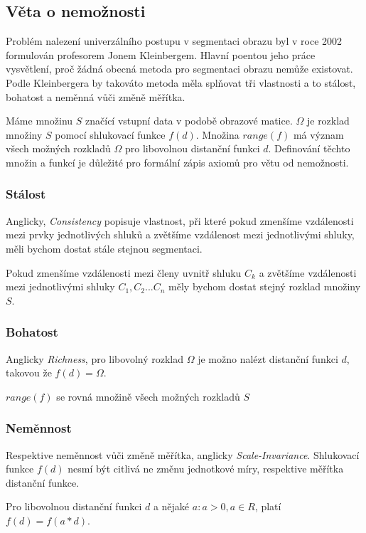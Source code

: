 \documentclass[czech, master, public, dept460, male, cpdeclaration, oneside]{diploma}
\begin{document}
\subsection{Věta o nemožnosti}
Problém nalezení univerzálního postupu v segmentaci obrazu byl v roce 2002 formulován profesorem Jonem Kleinbergem. Hlavní poentou jeho práce vysvětlení, proč žádná obecná metoda pro segmentaci obrazu nemůže existovat. Podle Kleinbergera by takováto metoda měla splňovat tři vlastnosti a to stálost, bohatost a neměnná vůči změně měřítka. \cite{Kleinberg} \par
Máme množinu $S$ značící vstupní data v podobě obrazové matice. $\Omega$ je rozklad množiny $S$ pomocí shlukovací funkce $f(d)$. Množina  $range(f)$ má význam všech možných rozkladů $\Omega$ pro libovolnou distanční funkci  $d$. Definování těchto množin a funkcí je důležité pro formální zápis axiomů pro větu od nemožnosti.

\subsubsection{Stálost}
Anglicky, \textit{Consistency} popisuje vlastnost, při které pokud zmenšíme vzdálenosti mezi prvky jednotlivých shluků a zvětšíme vzdálenost mezi jednotlivými shluky, měli bychom dostat stále stejnou segmentaci.
\begin{definition}
	Pokud zmenšíme vzdálenosti mezi členy uvnitř shluku $C_k$ a zvětšíme vzdálenosti mezi
	jednotlivými shluky $C_1, C_2...C_n$ měly bychom dostat stejný rozklad množiny $S$.
\end{definition}

\subsubsection{Bohatost}
Anglicky \textit{Richness}, pro libovolný rozklad $\Omega$ je možno nalézt distanční funkci $d$, takovou že $f(d) = \Omega$.
\begin{definition}
	$range(f)$ se rovná množině všech možných rozkladů $S$
\end{definition}

\subsubsection{Neměnnost}
Respektive neměnnost vůči změně měřítka, anglicky \textit{Scale-Invariance}. Shlukovací funkce $f(d)$ nesmí být citlivá ne změnu jednotkové míry, respektive měřítka distanční funkce.
\begin{definition}
	Pro libovolnou distanční funkci $d$ a nějaké $a : a > 0, a \in R$, platí $f(d) = f(a * d)$.
\end{definition}
\end{document}
